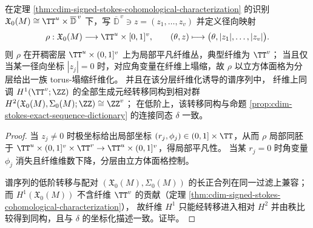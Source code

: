 

\begin{proposition}\label{prop:cdim-stokes-radial-fibration-transgression}
在定理 \ref{thm:cdim-signed-stokes-cohomological-characterization} 的识别
\(
\mathfrak X_0(M)\cong \TT^{u}\times \overline{\mathbb D}^{\,v}
\)
下，写 \(\overline{\mathbb D}^{\,v}\ni z=(z_1,\dots,z_v)\) 并定义径向映射
\[
\rho:\mathfrak X_0(M)\longrightarrow \TT^{u}\times[0,1]^{v},
\qquad
(\theta,z)\longmapsto \bigl(\theta,|z_1|,\dots,|z_v|\bigr).
\]
则 \(\rho\) 在开稠密层 \(\TT^{u}\times(0,1]^{v}\) 上为局部平凡纤维丛，典型纤维为 \(\TT^{v}\)；
当且仅当某一径向坐标 \(|z_j|=0\) 时，对应角变量在纤维上塌缩，故 \(\rho\) 以立方体面格为分层给出一族 torus-塌缩纤维化。
并且在该分层纤维化诱导的谱序列中，
纤维上同调 \(H^{1}(\TT^{v};\ZZ)\) 的全部生成元经转移同构到相对群
\(
H^{2}(\mathfrak X_0(M),\Sigma_0(M);\ZZ)\cong \ZZ^{v}
\)；
在低阶上，该转移同构与命题 \ref{prop:cdim-stokes-exact-sequence-dictionary} 的连接同态 \(\delta\) 一致。
\end{proposition}
\begin{proof}
当 \(z_j\neq 0\) 时极坐标给出局部坐标 \((r_j,\phi_j)\in(0,1]\times\TT\)，从而 \(\rho\) 局部同胚于
\(
\TT^{u}\times(0,1]^{v}\times \TT^{v}\to \TT^{u}\times(0,1]^{v}
\)，得局部平凡性。
当某 \(r_j=0\) 时角变量 \(\phi_j\) 消失且纤维维数下降，分层由立方体面格控制。
\par
谱序列的低阶转移与配对 \((\mathfrak X_0(M),\Sigma_0(M))\) 的长正合列在同一过滤上兼容；
而 \(H^{1}(\mathfrak X_0(M))\) 不含纤维 \(\TT^{v}\) 的贡献（定理 \ref{thm:cdim-signed-stokes-cohomological-characterization}），
故纤维 \(H^{1}\) 只能经转移进入相对 \(H^{2}\) 并由秩比较得到同构，且与 \(\delta\) 的坐标化描述一致。证毕。
\end{proof}

